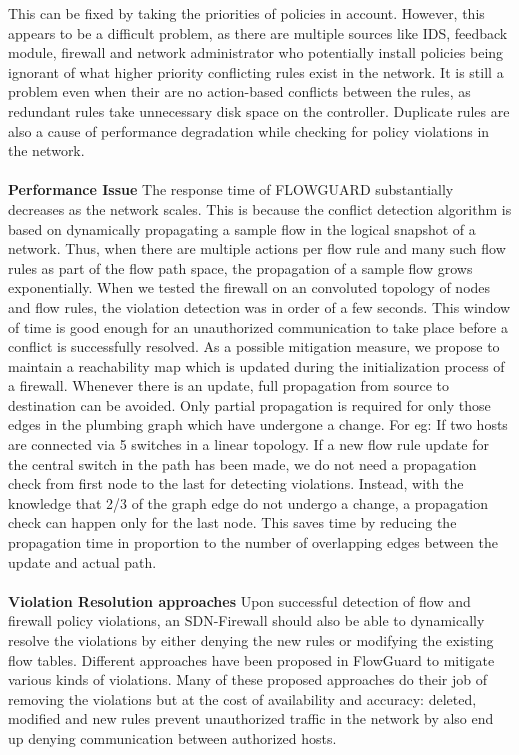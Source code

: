 This can be fixed by taking the priorities of policies in account. However, this appears to be a difficult problem, as there are multiple sources like IDS, feedback module, firewall and network administrator who potentially install policies being ignorant of what higher priority conflicting rules exist in the network. It is still a problem even when their are no action-based conflicts between the rules, as redundant rules take unnecessary disk space on the controller. Duplicate rules are also a cause of performance degradation while checking for policy violations in the network. \\ \\
\textbf{Performance Issue}
The response time of FLOWGUARD substantially decreases as the network scales. This is because the conflict detection algorithm is based on dynamically propagating a sample flow in the logical snapshot of a network. Thus, when there are multiple actions per flow rule and many such flow rules as part of the flow path space, the propagation of a sample flow grows exponentially. When we tested the firewall on an convoluted topology of nodes and flow rules, the violation detection was in order of a few seconds. This window of time is good enough for an unauthorized communication to take place before a conflict is successfully resolved.
As a possible mitigation measure, we propose to maintain a reachability map which is updated during the initialization process of a firewall. Whenever there is an update, full propagation from source to destination can be avoided. Only partial propagation is required for only those edges in the plumbing graph which have undergone a change. For eg: If two hosts are connected via 5 switches in a linear topology. If a new flow rule update for the central switch in the path has been made, we do not need a propagation check from first node to the last for detecting violations. Instead, with the knowledge that 2/3 of the graph edge do not undergo a change, a propagation check can happen only for the last node. This saves time by reducing the propagation
time in proportion to the number of overlapping edges between the update and actual path.\\ \\
\textbf{Violation Resolution approaches}
Upon successful detection of flow and firewall policy violations, an SDN-Firewall should also be able to dynamically resolve the violations by either denying the new rules or modifying the existing flow tables. Different approaches have been proposed in FlowGuard to mitigate various kinds of violations. Many of these proposed approaches do their job of removing the violations but at the cost of availability and accuracy: deleted, modified and new rules prevent unauthorized traffic in the network by also end up denying communication between authorized hosts.
